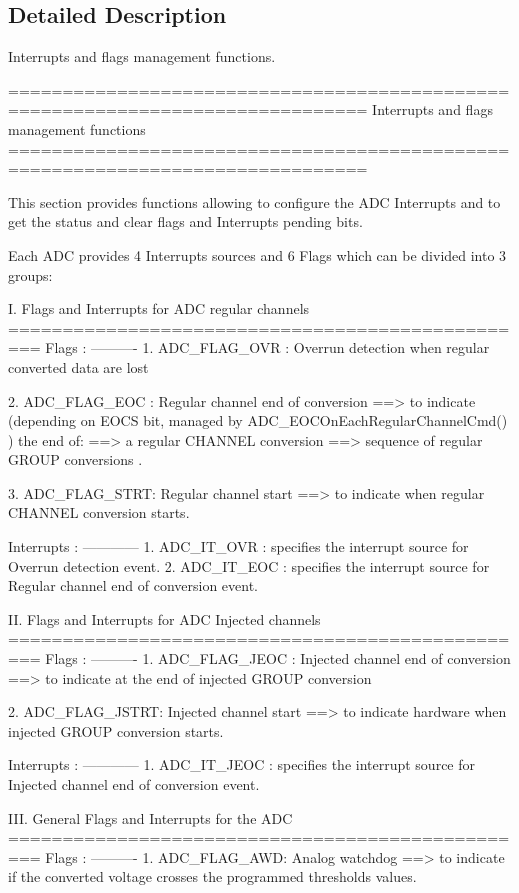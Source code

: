 \subsection{Detailed Description}
Interrupts and flags management functions. \begin{DoxyVerb} ===============================================================================
                   Interrupts and flags management functions
 ===============================================================================  

  This section provides functions allowing to configure the ADC Interrupts and 
  to get the status and clear flags and Interrupts pending bits.
  
  Each ADC provides 4 Interrupts sources and 6 Flags which can be divided into 
  3 groups:
  
  I. Flags and Interrupts for ADC regular channels
  =================================================
  Flags :
  ---------- 
     1. ADC_FLAG_OVR : Overrun detection when regular converted data are lost

     2. ADC_FLAG_EOC : Regular channel end of conversion ==> to indicate (depending 
              on EOCS bit, managed by ADC_EOCOnEachRegularChannelCmd() ) the end of:
               ==> a regular CHANNEL conversion 
               ==> sequence of regular GROUP conversions .

     3. ADC_FLAG_STRT: Regular channel start ==> to indicate when regular CHANNEL 
              conversion starts.

  Interrupts :
  ------------
     1. ADC_IT_OVR : specifies the interrupt source for Overrun detection event.  
     2. ADC_IT_EOC : specifies the interrupt source for Regular channel end of 
                     conversion event.
  
  
  II. Flags and Interrupts for ADC Injected channels
  =================================================
  Flags :
  ---------- 
     1. ADC_FLAG_JEOC : Injected channel end of conversion ==> to indicate at 
               the end of injected GROUP conversion  
              
     2. ADC_FLAG_JSTRT: Injected channel start ==> to indicate hardware when 
               injected GROUP conversion starts.

  Interrupts :
  ------------
     1. ADC_IT_JEOC : specifies the interrupt source for Injected channel end of 
                      conversion event.     

  III. General Flags and Interrupts for the ADC
  ================================================= 
  Flags :
  ---------- 
     1. ADC_FLAG_AWD: Analog watchdog ==> to indicate if the converted voltage 
              crosses the programmed thresholds values.
              

\end{DoxyVerb}
